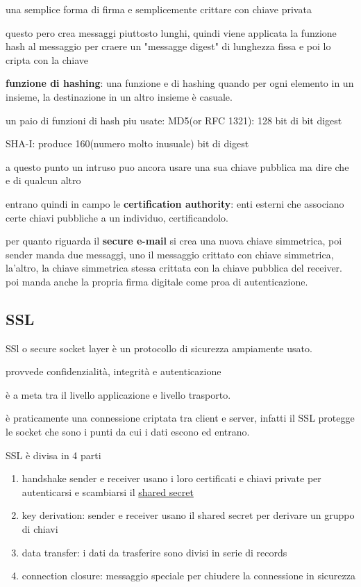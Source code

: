 \documentclass[12pt]{article}
\begin{document}
una semplice forma di firma e semplicemente crittare con chiave privata

questo pero crea messaggi piuttosto lunghi, quindi viene applicata la funzione hash al messaggio per craere un "messagge digest" di lunghezza fissa e poi lo cripta con la chiave

\textbf{funzione di hashing}: una funzione  e di hashing quando per ogni elemento in un insieme, la destinazione in un altro insieme è casuale.

un paio di funzioni di hash piu usate:
MD5(or RFC 1321): 128 bit di bit digest

SHA-I: produce 160(numero molto inusuale) bit di digest

a questo punto un intruso puo ancora usare una sua chiave pubblica ma dire che e di qualcun altro

entrano quindi in campo le \textbf{certification authority}: enti esterni che associano certe chiavi pubbliche a un individuo, certificandolo.


per quanto riguarda il \textbf{secure e-mail}  si crea una nuova chiave simmetrica, poi sender manda due messaggi, uno il messaggio crittato con chiave simmetrica, la'altro, la chiave simmetrica stessa crittata con la chiave pubblica del receiver. poi manda anche la propria firma digitale come proa di autenticazione.

\subsection{SSL}

SSl o secure socket layer è un protocollo di sicurezza ampiamente usato.

provvede confidenzialità, integrità e autenticazione

è a meta tra il livello applicazione e livello trasporto.

è  praticamente una connessione criptata tra client e server, infatti il SSL protegge le socket che sono i punti da cui i dati escono ed entrano.

SSL è divisa in 4 parti
\begin{enumerate}
    \item handshake sender e receiver usano i loro certificati e chiavi private per autenticarsi e scambiarsi il \underline{shared secret}
    \item key derivation: sender e receiver usano il shared secret per derivare un gruppo di chiavi
    \item data transfer: i dati da trasferire sono divisi in serie di records
    \item connection closure: messaggio speciale per chiudere la connessione in sicurezza

\end{enumerate}
\end{document}

